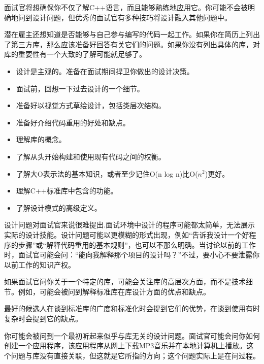 
面试官将想确保你不仅了解C++语言，而且能够熟练地应用它。你可能不会被明确地问到设计问题，但优秀的面试官有多种技巧将设计融入其他问题中。

潜在雇主还想知道是否能够与自己参与编写的代码一起工作。如果你在简历上列出了第三方库，那么应该准备好回答有关它们的问题。如果你没有列出具体的库，对库的重要性有一个大致的了解可能就足够了。


\begin{itemize}
\item
设计是主观的。准备在面试期间捍卫你做出的设计决策。

\item
面试前，回想一下过去设计的一个细节。

\item
准备好以视觉方式草绘设计，包括类层次结构。

\item
准备好介绍代码重用的好处和缺点。

\item
理解库的概念。

\item
了解从头开始构建和使用现有代码之间的权衡。

\item
了解大O表示法的基本知识，或者至少记住O(n log n)比O($n^2$)更好。

\item
理解C++标准库中包含的功能。

\item
了解设计模式的高级定义。
\end{itemize}


设计问题对面试官来说很难提出.面试环境中设计的程序可能都太简单，无法展示实际的设计技能。设计问题可能以更模糊的形式出现，例如“告诉我设计一个好程序的步骤”或“解释代码重用的基本规则”，也可以不那么明确。当讨论以前的工作时，面试官可能会问：“能向我解释那个项目的设计吗？”不过，要小心不要泄露你以前工作的知识产权。

如果面试官问你关于一个特定的库，可能会关注库的高层次方面，而不是技术细节。例如，可能会被问到解释标准库在库设计方面的优点和缺点。

最好的候选人在谈到标准库的广度和标准化时会提到它们的优势，在谈到使用有时复杂时会提到它的缺点。

你可能会被问到一个最初听起来似乎与库无关的设计问题。面试官可能会问你如何创建一个应用程序，该应用程序从网上下载MP3音乐并在本地计算机上播放。这个问题与库没有直接关联，但这就是它所指的方向；这个问题实际上是在问过程。

